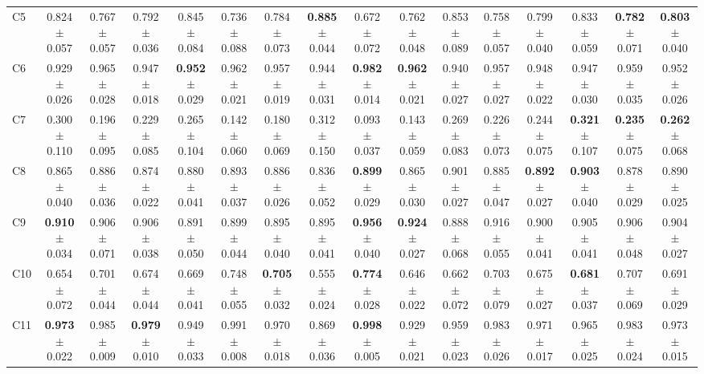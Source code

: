 \documentclass[11pt]{article}
\begin{document}
\begin{table}
{\begin{tabular}{lccccccccccccccc}
C5 & 0.824 $\pm$ 0.057 & 0.767 $\pm$ 0.057 & 0.792 $\pm$ 0.036 & 0.845 $\pm$ 0.084 & 0.736 $\pm$ 0.088 & 0.784 $\pm$ 0.073 & \textbf{0.885} $\pm$ 0.044 & 0.672 $\pm$ 0.072 & 0.762 $\pm$ 0.048 & 0.853 $\pm$ 0.089 & 0.758 $\pm$ 0.057 & 0.799 $\pm$ 0.040 & 0.833 $\pm$ 0.059 & \textbf{0.782} $\pm$ 0.071 & \textbf{0.803} $\pm$ 0.040 \\
C6 & 0.929 $\pm$ 0.026 & 0.965 $\pm$ 0.028 & 0.947 $\pm$ 0.018 & \textbf{0.952} $\pm$ 0.029 & 0.962 $\pm$ 0.021 & 0.957 $\pm$ 0.019 & 0.944 $\pm$ 0.031 & \textbf{0.982} $\pm$ 0.014 & \textbf{0.962} $\pm$ 0.021 & 0.940 $\pm$ 0.027 & 0.957 $\pm$ 0.027 & 0.948 $\pm$ 0.022 & 0.947 $\pm$ 0.030 & 0.959 $\pm$ 0.035 & 0.952 $\pm$ 0.026 \\
C7 & 0.300 $\pm$ 0.110 & 0.196 $\pm$ 0.095 & 0.229 $\pm$ 0.085 & 0.265 $\pm$ 0.104 & 0.142 $\pm$ 0.060 & 0.180 $\pm$ 0.069 & 0.312 $\pm$ 0.150 & 0.093 $\pm$ 0.037 & 0.143 $\pm$ 0.059 & 0.269 $\pm$ 0.083 & 0.226 $\pm$ 0.073 & 0.244 $\pm$ 0.075 & \textbf{0.321} $\pm$ 0.107 & \textbf{0.235} $\pm$ 0.075 & \textbf{0.262} $\pm$ 0.068 \\
C8 & 0.865 $\pm$ 0.040 & 0.886 $\pm$ 0.036 & 0.874 $\pm$ 0.022 & 0.880 $\pm$ 0.041 & 0.893 $\pm$ 0.037 & 0.886 $\pm$ 0.026 & 0.836 $\pm$ 0.052 & \textbf{0.899} $\pm$ 0.029 & 0.865 $\pm$ 0.030 & 0.901 $\pm$ 0.027 & 0.885 $\pm$ 0.047 & \textbf{0.892} $\pm$ 0.027 & \textbf{0.903} $\pm$ 0.040 & 0.878 $\pm$ 0.029 & 0.890 $\pm$ 0.025 \\
C9 & \textbf{0.910} $\pm$ 0.034 & 0.906 $\pm$ 0.071 & 0.906 $\pm$ 0.038 & 0.891 $\pm$ 0.050 & 0.899 $\pm$ 0.044 & 0.895 $\pm$ 0.040 & 0.895 $\pm$ 0.041 & \textbf{0.956} $\pm$ 0.040 & \textbf{0.924} $\pm$ 0.027 & 0.888 $\pm$ 0.068 & 0.916 $\pm$ 0.055 & 0.900 $\pm$ 0.041 & 0.905 $\pm$ 0.041 & 0.906 $\pm$ 0.048 & 0.904 $\pm$ 0.027 \\
C10 & 0.654 $\pm$ 0.072 & 0.701 $\pm$ 0.044 & 0.674 $\pm$ 0.044 & 0.669 $\pm$ 0.041 & 0.748 $\pm$ 0.055 & \textbf{0.705} $\pm$ 0.032 & 0.555 $\pm$ 0.024 & \textbf{0.774} $\pm$ 0.028 & 0.646 $\pm$ 0.022 & 0.662 $\pm$ 0.072 & 0.703 $\pm$ 0.079 & 0.675 $\pm$ 0.027 & \textbf{0.681} $\pm$ 0.037 & 0.707 $\pm$ 0.069 & 0.691 $\pm$ 0.029 \\
C11 & \textbf{0.973} $\pm$ 0.022 & 0.985 $\pm$ 0.009 & \textbf{0.979} $\pm$ 0.010 & 0.949 $\pm$ 0.033 & 0.991 $\pm$ 0.008 & 0.970 $\pm$ 0.018 & 0.869 $\pm$ 0.036 & \textbf{0.998} $\pm$ 0.005 & 0.929 $\pm$ 0.021 & 0.959 $\pm$ 0.023 & 0.983 $\pm$ 0.026 & 0.971 $\pm$ 0.017 & 0.965 $\pm$ 0.025 & 0.983 $\pm$ 0.024 & 0.973 $\pm$ 0.015 \\

\end{tabular}}
\end{table}
\end{document}
